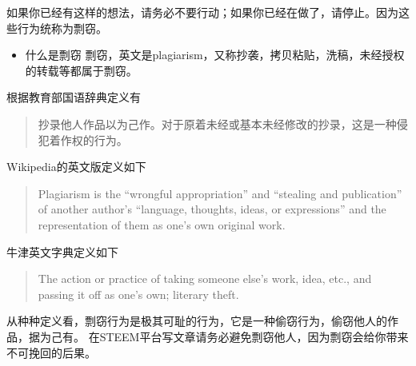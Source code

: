 \documentclass[]{ctexbook}
\providecommand{\tightlist}{%
  \setlength{\itemsep}{0pt}\setlength{\parskip}{0pt}}
\begin{document}
如果你已经有这样的想法，请务必不要行动；如果你已经在做了，请停止。因为这些行为统称为剽窃。

\begin{itemize}
\tightlist
\item
  什么是剽窃
  剽窃，英文是plagiarism，又称抄袭，拷贝粘贴，洗稿，未经授权的转载等都属于剽窃。
\end{itemize}

根据教育部国语辞典定义有

\begin{quote}
抄录他人作品以为己作。对于原着未经或基本未经修改的抄录，这是一种侵犯着作权的行为。
\end{quote}

Wikipedia的英文版定义如下

\begin{quote}
Plagiarism is the ``wrongful appropriation'' and ``stealing and publication'' of another author's ``language, thoughts, ideas, or expressions'' and the representation of them as one's own original work.
\end{quote}

牛津英文字典定义如下

\begin{quote}
The action or practice of taking someone else's work, idea, etc., and passing it off as one's own; literary theft.
\end{quote}

从种种定义看，剽窃行为是极其可耻的行为，它是一种偷窃行为，偷窃他人的作品，据为己有。
在STEEM平台写文章请务必避免剽窃他人，因为剽窃会给你带来不可挽回的后果。
\end{document}
